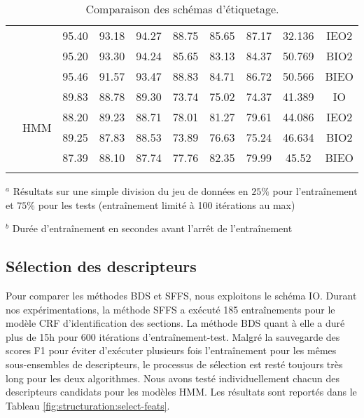\begin{table}[h]
\begin{center}
\begin{tabular}{p{0.9cm}|c|cccccccc}
&  & 95.40 & 93.18 & 94.27 & 88.75 & 85.65 & 87.17 & 32.136 & IEO2 \\
 &  & 95.20 & 93.30 & 94.24 & 85.65 & 83.13 & 84.37 & 50.769 & BIO2 \\
  &  & 95.46 & 91.57 & 93.47 & 88.83 & 84.71 & 86.72 & 50.566 & BIEO \\ \cline{2-10}
  & \multirow{4}{*}{HMM} & 89.83 & 88.78 & 89.30 & 73.74 & 75.02 & 74.37 &  41.389 & IO \\%
   &  & 88.20 & 89.23 & 88.71 & 78.01 & 81.27 & 79.61 & 44.086 & IEO2 \\
  &  & 89.25 & 87.83 & 88.53 & 73.89 & 76.63 & 75.24 & 46.634 & BIO2 \\
  &  & 87.39 & 88.10 & 87.74 & 77.76 & 82.35 & 79.99 & 45.52& BIEO \\ 
\noalign{\smallskip}\hline\noalign{\smallskip}
\end{tabular}
\caption{Comparaison des schémas d'étiquetage.}\label{fig:structuration:select-segm-repr}
\end{center}

$^a$ Résultats sur une simple division du jeu de données en $25\%$ pour l'entraînement et  $75\%$ pour les tests (entraînement limité à 100 itérations au max)

$^b$ Durée d'entraînement en secondes avant l'arrêt de l'entraînement
\end{table}


\subsection{Sélection des descripteurs}
Pour comparer les méthodes BDS et SFFS, nous exploitons le schéma IO. Durant nos expérimentations, la méthode SFFS a exécuté 185 entraînements pour le modèle CRF d'identification des sections. La méthode BDS quant à elle a duré plus de 15h pour 600 itérations d'entraînement-test. Malgré la sauvegarde des scores F1 pour éviter d'exécuter plusieurs fois l'entraînement pour les mêmes sous-ensembles de descripteurs, le processus de sélection est resté toujours très long pour les deux algorithmes. Nous avons testé individuellement chacun des descripteurs candidats pour les modèles HMM. Les résultats sont reportés dans le Tableau \ref{fig:structuration:select-feats}.

